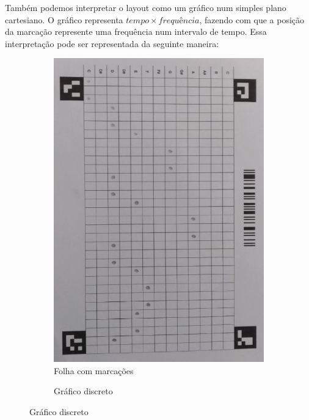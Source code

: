 \documentclass[12pt]{report}
\begin{document}
Também podemos interpretar o layout como um gráfico num simples plano
cartesiano. O gráfico representa $tempo \times frequência$, fazendo
com que a posição da marcação represente uma frequência num intervalo
de tempo. Essa interpretação pode ser representada da seguinte
maneira:

\begin{figure}[H]
  \centering
  \begin{subfigure}{0.4\textwidth}
    \centering
    \includegraphics[angle=90,origin=c,width=1\textwidth]{imagens/layout_preenchido.jpeg}
    \caption{Folha com marcações}
    \label{fig:layout_marcacao}
  \end{subfigure}
  \begin{subfigure}{0.5\textwidth}
    \centering
    \caption{Gráfico discreto}
    \label{fig:gráfico}
  \end{subfigure}%
\end{figure}
\end{document}
